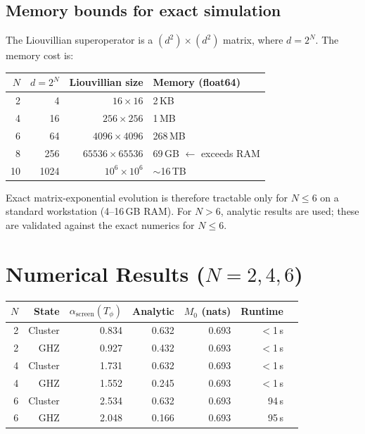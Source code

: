\documentclass[11pt,letterpaper]{article}
\newcommand{\asc}{\alpha_{\mathrm{screen}}}
\begin{document}
\subsection{Memory bounds for exact simulation}

The Liouvillian superoperator is a $(d^2)\times(d^2)$ matrix, where $d = 2^N$.
The memory cost is:

\begin{center}\small
\begin{tabular}{@{}rrrl@{}}
\toprule
$N$ & $d = 2^N$ & Liouvillian size & Memory (float64) \\
\midrule
2 & 4 & $16 \times 16$ & 2\,KB \\
4 & 16 & $256 \times 256$ & 1\,MB \\
6 & 64 & $4096 \times 4096$ & 268\,MB \\
8 & 256 & $65536 \times 65536$ & 69\,GB $\leftarrow$ exceeds RAM \\
10 & 1024 & $10^6 \times 10^6$ & $\sim$16\,TB \\
\bottomrule
\end{tabular}
\end{center}

Exact matrix-exponential evolution is therefore tractable only for $N \leq 6$ on
a standard workstation (4--16\,GB RAM).  For $N > 6$, analytic results are used;
these are validated against the exact numerics for $N \leq 6$.

\section{Numerical Results ($N = 2, 4, 6$)}

\begin{center}\small
\begin{tabular}{@{}rrrrrrr@{}}
\toprule
$N$ & State & $\asc(T_\phi)$ & Analytic & $M_0$ (nats) & Runtime \\
\midrule
2 & Cluster & 0.834 & 0.632 & 0.693 & $<$1\,s \\
2 & GHZ & 0.927 & 0.432 & 0.693 & $<$1\,s \\
4 & Cluster & 1.731 & 0.632 & 0.693 & $<$1\,s \\
4 & GHZ & 1.552 & 0.245 & 0.693 & $<$1\,s \\
6 & Cluster & 2.534 & 0.632 & 0.693 & 94\,s \\
6 & GHZ & 2.048 & 0.166 & 0.693 & 95\,s \\
\bottomrule
\end{tabular}
\end{center}
\end{document}

